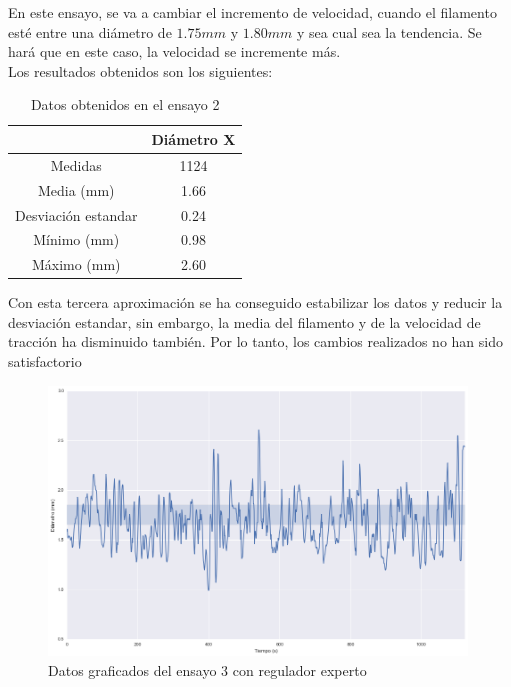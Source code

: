 En este ensayo, se va a cambiar el incremento de velocidad, cuando el filamento esté entre una diámetro de $1.75 mm$ y $1.80 mm$ y sea cual sea la tendencia. Se hará que en este caso, la velocidad se incremente más.\\

Los resultados obtenidos son los siguientes:

\begin{table}[H]
	\centering
	\begin{tabular}{cc}
		                    & Diámetro X \\ \hline
		Medidas             & 1124      \\
		Media (mm)          & 1.66       \\
		Desviación estandar & 0.24       \\
		Mínimo (mm)         & 0.98       \\
		Máximo (mm)         & 2.60      
	\end{tabular}
	\caption{Datos obtenidos en el ensayo 2}
	\label{tab:resl_ens1}
\end{table}

Con esta tercera aproximación se ha conseguido estabilizar los datos y reducir la desviación estandar, sin embargo, la media del filamento y de la velocidad de tracción ha disminuido también. Por lo tanto, los cambios realizados no han sido satisfactorio


\begin{figure}[H]
    \centering
    \includegraphics[width=0.99\textwidth]{images/producciones/12082015/output_9_e2.png}
    \caption{Datos graficados del ensayo 3 con regulador experto}
    \label{fig:reg_graf3}
\end{figure}

